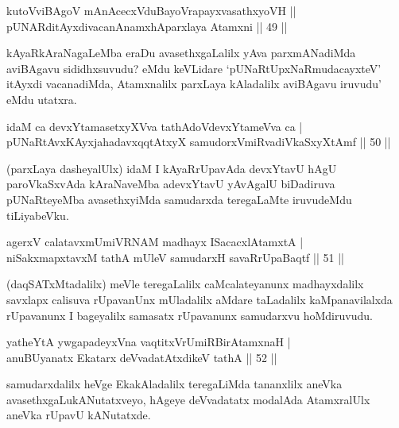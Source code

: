 \begin{shl}
kutoV\s viBAgoV mAnAcecxVduBayoVrapayxvasathxyoVH ||  \\
pUNARditAyxdivacanAnamxhAparxlaya Atamxni \hfill||  49 ||  
\end{shl}

\begin{artha}
kAyaRkAraNagaLeMba eraDu avasethxgaLalilx yAva parxmANadiMda aviBAgavu sididhxsuvudu? eMdu keVLidare `pUNaRtUpxNaRmudacayxteV' itAyxdi vacanadiMda, Atamxnalilx parxLaya kAladalilx aviBAgavu iruvudu' eMdu utatxra.
\end{artha}

\begin{shl}
idaM ca devxYtamasetxyXVva tathA\s doV\s devxYtameVva ca  | \\
pUNaRtAvxKAyxja{\null}hadavxqqtAtxyX samudorxVmiRvadiVkaSxyXtAmf \hfill||  50 ||  
\end{shl}

\begin{artha}
(parxLaya dasheyalUlx) idaM I kAyaRrUpavAda devxYtavU hAgU paroVkaSxvAda kAraNaveMba adevxYtavU yAvAgalU biDadiruva pUNaRteyeMba avasethxyiMda samudarxda teregaLaMte iruvudeMdu tiLiyabeVku.
\end{artha}

\begin{shl}
agerxV calatavxmUmiVRNAM madhayx ISacacxlAtamxtA  | \\
niSakxmapxtavxM tathA mUleV samudarxH savaRrUpaBaqtf \hfill||  51 ||  
\end{shl}

\begin{artha}
(daqSATxMtadalilx) meVle teregaLalilx caMcalateyanunx madhayxdalilx savxlapx calisuva rUpavanUnx mUladalilx aMdare taLadalilx kaMpanavilalxda rUpavanunx I bageyalilx samasatx rUpavanunx samudarxvu hoMdiruvudu.
\end{artha}

\begin{shl}
yatheYtA ywgapadeyxVna vaqtitxVrUmiRBirAtamxnaH  | \\
anuBUyanatx Ekatarx deVvadatAtxdikeV tathA \hfill||  52 ||  
\end{shl}

\begin{artha}
samudarxdalilx heVge EkakAladalilx teregaLiMda tananxlilx aneVka avasethxgaLu\break kANutatxveyo, hAgeye deVvadatatx modalAda AtamxralUlx aneVka rUpavU kANutatxde.
\end{artha}

